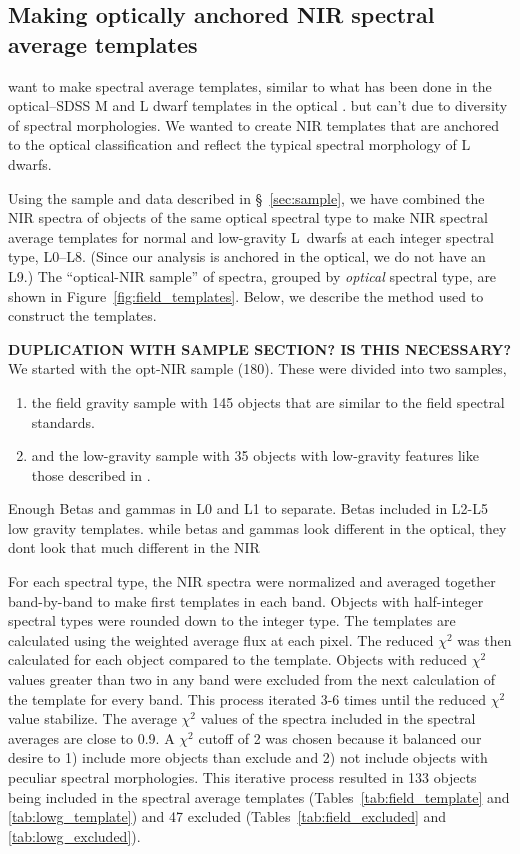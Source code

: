 \documentclass[12pt,preprint]{aastex}
\begin{document}
\clearpage
\subsection{Making optically anchored NIR spectral average templates}
\label{sec:templates}

want to make spectral average templates, similar to  what has been done in the optical--SDSS M and L dwarf templates in the optical \cite{Bochanski07_templates, Schmidt:2014jc}. but can't due to diversity of spectral morphologies.
We wanted to create NIR templates that are anchored to the optical classification and reflect the typical spectral morphology of L dwarfs. 

Using the sample and data described in \S~\ref{sec:sample}, we have combined the NIR spectra of objects of the same optical spectral type to make NIR spectral average templates for normal and low-gravity L~dwarfs at each integer spectral type, L0--L8. (Since our analysis is anchored in the optical, we do not have an L9.) 
The ``optical-NIR sample'' of spectra, grouped by \emph{optical} spectral type, are shown in Figure~\ref{fig:field_templates}.
Below, we describe the method used to construct the templates.

\textbf{DUPLICATION WITH SAMPLE SECTION? IS THIS NECESSARY?}\\
We started with the opt-NIR sample (180). 
These were divided into two samples, 
\begin{enumerate} \itemsep1pt \parskip0pt 
	\item the field gravity sample with 145 objects that are similar to the \citet{K99} field spectral standards.
	\item and the low-gravity sample with 35 objects with low-gravity features like those described in \citet{Cruz09_lowg}.
\end{enumerate}

Enough Betas and gammas in L0 and L1 to separate.
Betas included in L2-L5 low gravity templates.
while betas and gammas look different in the optical, they dont look that much different in the NIR

For each spectral type, the NIR spectra were normalized and averaged together band-by-band to make first templates in each band. Objects with half-integer spectral types were rounded down to the integer type.
The templates are calculated using the weighted average flux at each pixel. 
The reduced $\chi^2$ was then calculated for each object compared to the template.
Objects with reduced $\chi^2$ values greater than two in any band were excluded from the next calculation of the template for every band.
This process iterated 3-6 times until the reduced $\chi^2$ value stabilize. 
The average $\chi^2$ values of the spectra included in the spectral averages are close to 0.9. 
A $\chi^2$ cutoff of 2 was chosen because it balanced our desire to 1) include more objects than exclude and 2) not include objects with peculiar spectral morphologies. 
This iterative process resulted in 133 objects being included in the spectral average templates (Tables~\ref{tab:field_template} and \ref{tab:lowg_template}) and 47 excluded (Tables~\ref{tab:field_excluded} and \ref{tab:lowg_excluded}). 
\end{document}
